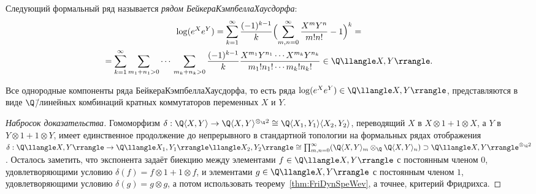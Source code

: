 \documentclass[
	extrafontsizes,
	11pt,
	hyphens,
]{memoir}
\begin{document}
\begin{definition}
Следующий формальный ряд называется \emph{рядом Бейкера\namedash{}Кэмпбелла\namedash{}Хаусдорфа}:
\begin{equation}
	\begin{gathered}
		\log(e^X e^Y) =
		\sum_{k=1}^{\infty}
		\frac{(-1)^{k-1}}{k}
		\Bigl(\sum_{m, n = 0}^{\infty}
		\frac{X^m Y^n}{m! n!} - 1\Bigr)^k
		=
		\\
		=
		\sum_{k=1}^{\infty}
		\sum_{m_1 + n_1 > 0}
		\cdots{}
		\sum_{m_k + n_k > 0}
		\frac{(-1)^{k-1}}{k}
		\frac%
		{X^{m_1} Y^{n_1} \cdots{} X^{m_k} Y^{n_k}}%
		{m_1! n_1! \cdots{} m_k! n_k!}
		\in \Q \llangle X, Y \rrangle.%
		\label{eq:BakCamHauSeries}
	\end{gathered}
\end{equation}
\end{definition}

\begin{theorem}
Все однородные компоненты ряда Бейкера\namedash{}Кэмпбелла\namedash{}Хаусдорфа, то есть ряда \(\log(e^X e^Y) \in \Q \llangle X, Y \rrangle\), представляются в виде \(\Q\)\=/линейных комбинаций кратных коммутаторов переменных \(X\) и \(Y\).
\end{theorem}

\begin{proof}[Набросок доказательства]
Гомоморфизм
\(
	\delta :
	\Q \langle X, Y \rangle
	\to
	\Q \langle X, Y \rangle^{\otimes_{\Q} 2}
	\cong
	\Q \langle X_1, Y_1 \rangle
	   \langle X_2, Y_2 \rangle
\),
переводящий \(X\) в \(X \otimes 1 + 1 \otimes X\), а \(Y\) в \(Y \otimes 1 + 1 \otimes Y\),
имеет единственное продолжение до непрерывного в стандартной топологии на формальных рядах отображения
\(
	\delta :
	\Q \llangle X, Y \rrangle
	\to
	\Q \llangle X_1, Y_1 \rrangle
	   \llangle X_2, Y_2 \rrangle
	\cong
	\prod_{m, n = 0}^{\infty}
	(\Q \langle X, Y \rangle_m
	 \otimes_{\Q}
	 \Q \langle X, Y \rangle_n)
	\supset
	\Q \llangle X, Y \rrangle^{\otimes_{\Q} 2}
\).
Осталось заметить, что экспонента задаёт биекцию между элементами \(f \in \Q \llangle X, Y \rrangle\) с постоянным членом \(0\), удовлетворяющими условию \(\delta(f) = f \otimes 1 + 1 \otimes f\), и элементами \(g \in \Q \llangle X, Y \rrangle\) с постоянным членом \(1\), удовлетворяющими условию \(\delta(g) = g \otimes g\), а потом использовать теорему~\ref{thm:FriDynSpeWev},
а точнее, критерий Фридрихса.
\end{proof}
\end{document}
